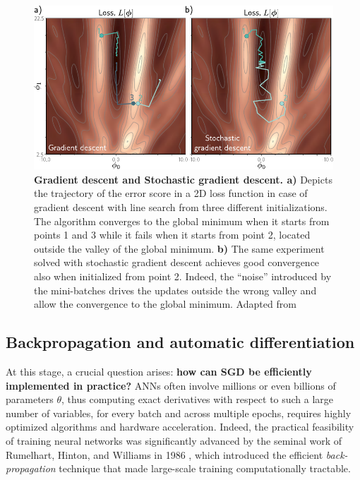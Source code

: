 \begin{figure}[H]
    \centering
    \includegraphics[width=\textwidth]{figures/Intro/sgd.pdf}
    \caption{\textbf{Gradient descent and Stochastic gradient descent. a)} Depicts the trajectory of the error score in 
     a 2D loss function in case of gradient descent with line search from three different initializations. The 
     algorithm converges to the global minimum when it starts from points 1 and 3 while it fails when it starts from 
     point 2, located outside the valley of the global minimum. \textbf{b)} The same experiment solved with stochastic 
     gradient descent achieves good convergence also when initialized from point 2. Indeed, the ``noise'' introduced 
     by the mini-batches drives the updates outside the wrong valley and allow the convergence to the global minimum. 
    Adapted from \cite{prince2023understanding}}
    \label{fig:sgd}
\end{figure}

\subsection{Backpropagation and automatic differentiation}

At this stage, a crucial question arises: \textbf{how can SGD be efficiently implemented in practice?}
ANNs often involve millions or even billions of parameters $\theta$, thus computing exact derivatives with respect to 
such a large number of variables, for every batch and across multiple epochs, requires highly optimized algorithms 
and hardware acceleration.
Indeed, the practical feasibility of training neural networks was significantly advanced by the seminal work of Rumelhart, 
Hinton, and Williams in 1986 \cite{Backpro_1986}, which introduced the efficient \textit{back-propagation} technique that made 
large-scale training computationally tractable.

